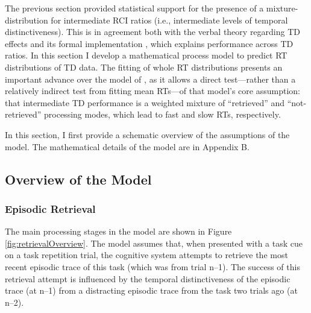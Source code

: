 \documentclass[a4paper, jou, natbib]{apa6}
\begin{document}
The previous section provided statistical support for the presence of a mixture-distribution for intermediate RCI ratios (i.e., intermediate levels of temporal distinctiveness). This is in agreement both with the verbal theory regarding TD effects \cite{Horoufchin2011a} and its formal implementation \cite{Grange2015}, which explains performance across TD ratios. In this section I develop a mathematical process model to predict RT distributions of TD data. The fitting of whole RT distributions presents an important advance over the model of \citet{Grange2015}, as it allows a direct test---rather than a relatively indirect test from fitting mean RTs---of that model's core assumption: that intermediate TD performance is a weighted mixture of ``retrieved'' and ``not-retrieved'' processing modes, which lead to fast and slow RTs, respectively. 

In this section, I first provide a schematic overview of the assumptions of the model. The mathematical details of the model are in Appendix B.

\subsection{Overview of the Model}

\subsubsection{Episodic Retrieval}
The main processing stages in the model are shown in Figure \ref{fig:retrievalOverview}. The model assumes that, when presented with a task cue on a task repetition trial, the cognitive system attempts to retrieve the most recent episodic trace of this task (which was from trial n--1). The success of this retrieval attempt is influenced by the temporal distinctiveness of the episodic trace (at n--1) from a distracting episodic trace from the task two trials ago (at n--2).  

\iftoggle{jou}{
\begin{figure}
\begin{center}
\texttt{[image: Images/retrievalOverview.pdf]}
\caption{Overview of the retrieval processes in the model.}
\label{fig:retrievalOverview}
\end{center}
\end{figure}
}{
\begin{figure}
\begin{center}
\texttt{[image: Images/retrievalOverview.pdf]}
\caption{Overview of the retrieval processes in the model.}
\label{fig:retrievalOverview}
\end{center}
\end{figure}
}
\end{document}

